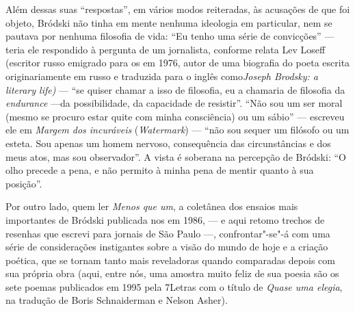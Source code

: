 Além dessas suas ``respostas'', em vários modos reiteradas, às
acusações de que foi objeto, Bródski não tinha em mente nenhuma
ideologia em particular, nem se pautava por nenhuma filosofia de vida:
``Eu tenho uma série de convicções'' --- teria ele respondido à
pergunta de um jornalista, conforme relata Lev Loseff (escritor russo emigrado
para os  em 1976, autor de uma biografia do poeta escrita
originariamente em russo e traduzida para o inglês como\emph{Joseph
Brodsky: a literary life)} --- ``se quiser
chamar a isso de filosofia, eu a chamaria de filosofia da
\emph{endurance} ---da possibilidade, da capacidade de resistir''.
``Não sou um ser moral (mesmo se procuro estar quite com minha
consciência) ou um sábio'' --- escreveu ele em \emph{Margem dos
incuráveis} (\emph{Watermark}) --- ``não sou sequer um filósofo ou um
esteta. Sou apenas um homem nervoso, consequência das circunstâncias e
dos meus atos, mas sou observador''. A vista é soberana na percepção de
Bródski: ``O olho precede a pena, e não permito à minha pena de mentir
quanto à sua posição''.

Por outro lado, quem ler \emph{Menos que um}, a coletânea dos ensaios
mais importantes de Bródski publicada nos  em 1986, --- e aqui
retomo trechos de resenhas que escrevi para jornais de São Paulo ---,
confrontar"-se"-á com uma série de considerações instigantes sobre a visão
do mundo de hoje e a criação poética, que se tornam tanto mais
reveladoras quando comparadas depois com sua própria obra (aqui, entre
nós, uma amostra muito feliz de sua poesia são os sete poemas publicados
em 1995 pela 7Letras com o título de \emph{Quase uma elegia}, na
tradução de Boris Schnaiderman e Nelson Asher).

